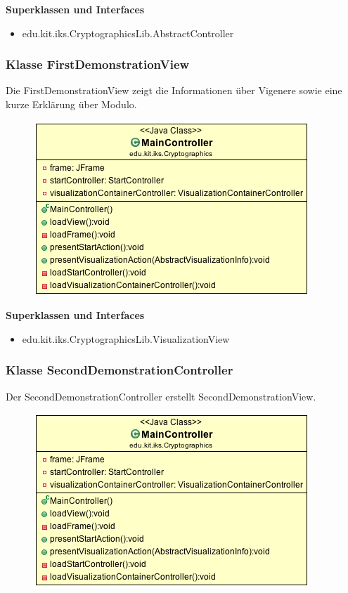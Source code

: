 \documentclass{article}
\begin{document}
      \textbf{Superklassen und Interfaces}
      \begin{itemize}
        \item edu.kit.iks.CryptographicsLib.AbstractController
      \end{itemize}

    \subsubsection{Klasse FirstDemonstrationView}
      Die FirstDemonstrationView zeigt die Informationen über Vigenere sowie eine kurze Erklärung über Modulo.
      \begin{figure}[H]
        \centering
        \includegraphics[width=\textwidth]{resources/edu-kit-iks-Cryptographics-MainController}
      \end{figure}

      \textbf{Superklassen und Interfaces}
      \begin{itemize}
        \item edu.kit.iks.CryptographicsLib.VisualizationView
      \end{itemize}

    \subsubsection{Klasse SecondDemonstrationController}
      Der SecondDemonstrationController erstellt SecondDemonstrationView.
      \begin{figure}[H]
        \centering
        \includegraphics[width=\textwidth]{resources/edu-kit-iks-Cryptographics-MainController}
      \end{figure}
\end{document}
